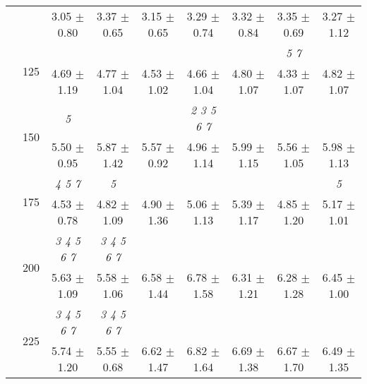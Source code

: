 \begin{table}[h]
{\begin{tabular}{
        ccccccccc}
 & & 3.05 $\pm$ 0.80& 3.37 $\pm$ 0.65& 3.15 $\pm$ 0.65& 3.29 $\pm$ 0.74& 3.32 $\pm$ 0.84& 3.35 $\pm$ 0.69& 3.27 $\pm$ 1.12 \\ 
 & \multirow{2}{*}{125}& \cellcolor[HTML]{EFEFEF} & \cellcolor[HTML]{EFEFEF} & \cellcolor[HTML]{EFEFEF} & \cellcolor[HTML]{EFEFEF} & \cellcolor[HTML]{EFEFEF} & \cellcolor[HTML]{EFEFEF} \textit{ 5 7 }& \cellcolor[HTML]{EFEFEF}  \\ 
 & & \cellcolor[HTML]{EFEFEF} 4.69 $\pm$ 1.19& \cellcolor[HTML]{EFEFEF} 4.77 $\pm$ 1.04& \cellcolor[HTML]{EFEFEF} 4.53 $\pm$ 1.02& \cellcolor[HTML]{EFEFEF} 4.66 $\pm$ 1.04& \cellcolor[HTML]{EFEFEF} 4.80 $\pm$ 1.07& \cellcolor[HTML]{EFEFEF} 4.33 $\pm$ 1.07& \cellcolor[HTML]{EFEFEF} 4.82 $\pm$ 1.07 \\ 
 & \multirow{2}{*}{150}& \textit{ 5 }& & & \textit{ 2 3 5 6 7 }& & &  \\ 
 & & 5.50 $\pm$ 0.95& 5.87 $\pm$ 1.42& 5.57 $\pm$ 0.92& 4.96 $\pm$ 1.14& 5.99 $\pm$ 1.15& 5.56 $\pm$ 1.05& 5.98 $\pm$ 1.13 \\ 
 & \multirow{2}{*}{175}& \cellcolor[HTML]{EFEFEF} \textit{ 4 5 7 }& \cellcolor[HTML]{EFEFEF} \textit{ 5 }& \cellcolor[HTML]{EFEFEF} & \cellcolor[HTML]{EFEFEF} & \cellcolor[HTML]{EFEFEF} & \cellcolor[HTML]{EFEFEF} & \cellcolor[HTML]{EFEFEF} \textit{ 5 } \\ 
 & & \cellcolor[HTML]{EFEFEF} 4.53 $\pm$ 0.78& \cellcolor[HTML]{EFEFEF} 4.82 $\pm$ 1.09& \cellcolor[HTML]{EFEFEF} 4.90 $\pm$ 1.36& \cellcolor[HTML]{EFEFEF} 5.06 $\pm$ 1.13& \cellcolor[HTML]{EFEFEF} 5.39 $\pm$ 1.17& \cellcolor[HTML]{EFEFEF} 4.85 $\pm$ 1.20& \cellcolor[HTML]{EFEFEF} 5.17 $\pm$ 1.01 \\ 
 & \multirow{2}{*}{200}& \textit{ 3 4 5 6 7 }& \textit{ 3 4 5 6 7 }& & & & &  \\ 
 & & 5.63 $\pm$ 1.09& 5.58 $\pm$ 1.06& 6.58 $\pm$ 1.44& 6.78 $\pm$ 1.58& 6.31 $\pm$ 1.21& 6.28 $\pm$ 1.28& 6.45 $\pm$ 1.00 \\ 
 & \multirow{2}{*}{225}& \cellcolor[HTML]{EFEFEF} \textit{ 3 4 5 6 7 }& \cellcolor[HTML]{EFEFEF} \textit{ 3 4 5 6 7 }& \cellcolor[HTML]{EFEFEF} & \cellcolor[HTML]{EFEFEF} & \cellcolor[HTML]{EFEFEF} & \cellcolor[HTML]{EFEFEF} & \cellcolor[HTML]{EFEFEF}  \\ 
 & & \cellcolor[HTML]{EFEFEF} 5.74 $\pm$ 1.20& \cellcolor[HTML]{EFEFEF} 5.55 $\pm$ 0.68& \cellcolor[HTML]{EFEFEF} 6.62 $\pm$ 1.47& \cellcolor[HTML]{EFEFEF} 6.82 $\pm$ 1.64& \cellcolor[HTML]{EFEFEF} 6.69 $\pm$ 1.38& \cellcolor[HTML]{EFEFEF} 6.67 $\pm$ 1.70& \cellcolor[HTML]{EFEFEF} 6.49 $\pm$ 1.35 \\ 

\end{tabular}}
\end{table}
